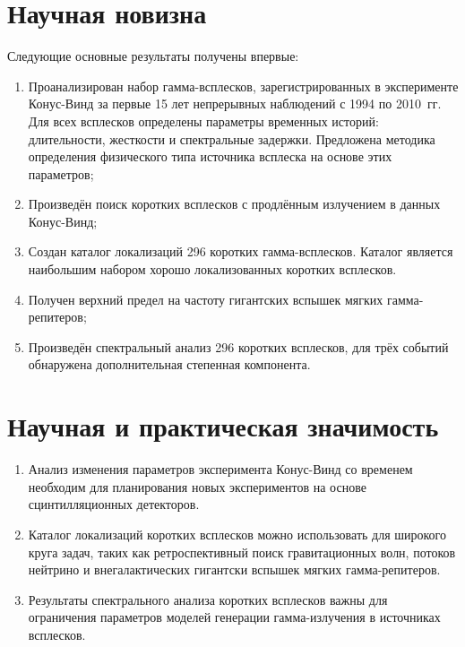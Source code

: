 \section*{Научная новизна}

Следующие основные результаты получены впервые:
\begin{enumerate}
\item Проанализирован набор гамма-всплесков, зарегистрированных в эксперименте 
Конус-Винд за первые 15 лет непрерывных наблюдений с 1994 по 2010~гг. Для всех 
всплесков определены параметры временных историй: длительности, жесткости и спектральные задержки.
Предложена методика определения физического типа источника всплеска на основе этих параметров;
\item Произведён поиск коротких всплесков с продлённым излучением в данных Конус-Винд;
\item Создан каталог локализаций 296 коротких гамма-всплесков. Каталог является 
наибольшим набором хорошо локализованных коротких всплесков. 
\item Получен верхний предел на частоту гигантских вспышек мягких гамма-репитеров;
\item Произведён спектральный анализ 296 коротких всплесков, для трёх событий обнаружена
дополнительная степенная компонента.

\end{enumerate}


\section*{Научная и практическая значимость}

\begin{enumerate}
\item Анализ изменения параметров эксперимента Конус-Винд со временем необходим для 
планирования новых экспериментов на основе сцинтилляционных детекторов.
\item Каталог локализаций коротких всплесков можно использовать 
для широкого круга задач, таких как ретроспективный поиск гравитационных волн, потоков нейтрино 
и внегалактических гигантски вспышек мягких гамма-репитеров.
\item Результаты спектрального анализа коротких всплесков важны для ограничения параметров
моделей генерации гамма-излучения в источниках всплесков.
\end{enumerate}

